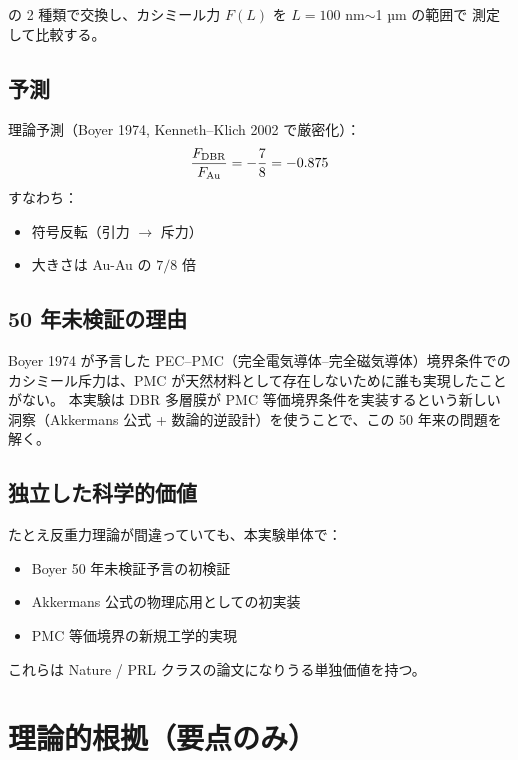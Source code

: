 \documentclass[11pt,a4paper]{article}
\def\textbf#1{#1}%
\begin{document}
の 2 種類で交換し、カシミール力 $F(L)$ を $L = 100$ nm$\sim$1 µm の範囲で
測定して比較する。

\subsection{予測}

理論予測（Boyer 1974, Kenneth--Klich 2002 で厳密化）：
\[
  \frac{F_{\rm DBR}}{F_{\rm Au}} = -\frac{7}{8} = -0.875
\]
すなわち：
\begin{itemize}
\item 符号反転（引力 $\to$ 斥力）
\item 大きさは Au-Au の $7/8$ 倍
\end{itemize}

\subsection{50 年未検証の理由}

Boyer 1974 が予言した PEC--PMC（完全電気導体--完全磁気導体）境界条件での
カシミール斥力は、PMC が天然材料として存在しないために誰も実現したことがない。
本実験は \textbf{DBR 多層膜が PMC 等価境界条件を実装する}という新しい
洞察（Akkermans 公式 + 数論的逆設計）を使うことで、この 50 年来の問題を
解く。

\subsection{独立した科学的価値}

たとえ反重力理論が間違っていても、本実験単体で：

\begin{itemize}
\item Boyer 50 年未検証予言の初検証
\item Akkermans 公式の物理応用としての初実装
\item PMC 等価境界の新規工学的実現
\end{itemize}

これらは \textbf{Nature / PRL クラスの論文}になりうる単独価値を持つ。

\newpage

\section{理論的根拠（要点のみ）}
\end{document}
